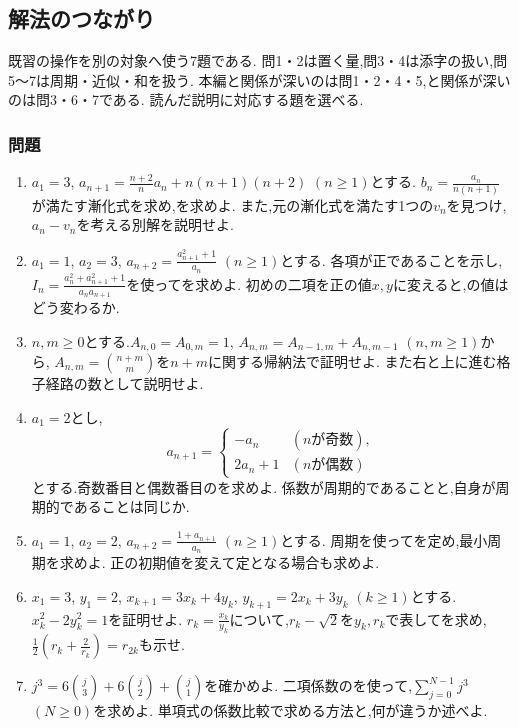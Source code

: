 \subsection{解法のつながり}\label{節：解法のつながり}
既習の操作を別の対象へ使う7題である.
問1・2は置く量,問3・4は添字の扱い,問5〜7は周期・近似・和を扱う.
本編と関係が深いのは問1・2・4・5,と関係が深いのは問3・6・7である.
読んだ説明に対応する題を選べる.

\subsubsection{問題}
\begin{enumerate}[label=\textbf{問\arabic*.},format=\bookitemlink{practice-connections}{problem}{hint}]
  \item $a_1=3$,
    $a_{n+1}=\frac{n+2}{n}a_n+n(n+1)(n+2)$ $(n\ge1)$とする.
    $b_n=\frac{a_n}{n(n+1)}$が満たす漸化式を求め,を求めよ.
    また,元の漸化式を満たす1つの$v_n$を見つけ,
    $a_n-v_n$を考える別解を説明せよ.
  \item $a_1=1$, $a_2=3$,
    $a_{n+2}=\frac{a_{n+1}^2+1}{a_n}$ $(n\ge1)$とする.
    各項が正であることを示し,
    $I_n=\frac{a_n^2+a_{n+1}^2+1}{a_na_{n+1}}$を使ってを求めよ.
    初めの二項を正の値$x,y$に変えると,の値はどう変わるか.
  \item $n,m\ge0$とする.$A_{n,0}=A_{0,m}=1$,
    $A_{n,m}=A_{n-1,m}+A_{n,m-1}$ $(n,m\ge1)$から,
    $A_{n,m}=\binom{n+m}{m}$を$n+m$に関する帰納法で証明せよ.
    また右と上に進む格子経路の数として説明せよ.
  \item $a_1=2$とし,
    \[
      a_{n+1}=\begin{cases}
        -a_n&(n\text{が奇数}),\\
        2a_n+1&(n\text{が偶数})
      \end{cases}
    \]
    とする.奇数番目と偶数番目のを求めよ.
    係数が周期的であることと,自身が周期的であることは同じか.
  \item $a_1=1$, $a_2=2$,
    $a_{n+2}=\frac{1+a_{n+1}}{a_n}$ $(n\ge1)$とする.
    周期を使ってを定め,最小周期を求めよ.
    正の初期値を変えて定となる場合も求めよ.
  \item $x_1=3$, $y_1=2$,
    $x_{k+1}=3x_k+4y_k$, $y_{k+1}=2x_k+3y_k$ $(k\ge1)$とする.
    $x_k^2-2y_k^2=1$を証明せよ.
    $r_k=\frac{x_k}{y_k}$について,$r_k-\sqrt2$を$y_k,r_k$で表してを求め,
    $\frac12\left(r_k+\frac{2}{r_k}\right)=r_{2k}$も示せ.
  \item $j^3=6\binom j3+6\binom j2+\binom j1$を確かめよ.
    二項係数のを使って,$\sum_{j=0}^{N-1}j^3$ $(N\ge0)$を求めよ.
    単項式の係数比較で求める方法と,何が違うか述べよ.
\end{enumerate}

